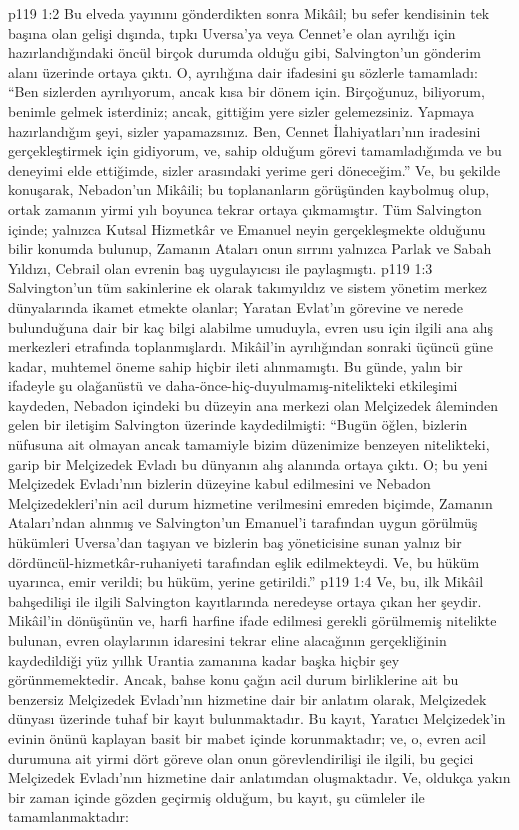 \vs p119 1:2 Bu elveda yayınını gönderdikten sonra Mikâil; bu sefer kendisinin tek başına olan gelişi dışında, tıpkı Uversa’ya veya Cennet’e olan ayrılığı için hazırlandığındaki öncül birçok durumda olduğu gibi, Salvington’un gönderim alanı üzerinde ortaya çıktı. O, ayrılığına dair ifadesini şu sözlerle tamamladı: “Ben sizlerden ayrılıyorum, ancak kısa bir dönem için. Birçoğunuz, biliyorum, benimle gelmek isterdiniz; ancak, gittiğim yere sizler gelemezsiniz. Yapmaya hazırlandığım şeyi, sizler yapamazsınız. Ben, Cennet İlahiyatları’nın iradesini gerçekleştirmek için gidiyorum, ve, sahip olduğum görevi tamamladığımda ve bu deneyimi elde ettiğimde, sizler arasındaki yerime geri döneceğim.” Ve, bu şekilde konuşarak, Nebadon’un Mikâili; bu toplananların görüşünden kaybolmuş olup, ortak zamanın yirmi yılı boyunca tekrar ortaya çıkmamıştır. Tüm Salvington içinde; yalnızca Kutsal Hizmetkâr ve Emanuel neyin gerçekleşmekte olduğunu bilir konumda bulunup, Zamanın Ataları onun sırrını yalnızca Parlak ve Sabah Yıldızı, Cebrail olan evrenin baş uygulayıcısı ile paylaşmıştı.
\vs p119 1:3 Salvington’un tüm sakinlerine ek olarak takımyıldız ve sistem yönetim merkez dünyalarında ikamet etmekte olanlar; Yaratan Evlat’ın görevine ve nerede bulunduğuna dair bir kaç bilgi alabilme umuduyla, evren usu için ilgili ana alış merkezleri etrafında toplanmışlardı. Mikâil’in ayrılığından sonraki üçüncü güne kadar, muhtemel öneme sahip hiçbir ileti alınmamıştı. Bu günde, yalın bir ifadeyle şu olağanüstü ve daha\hyp{}önce\hyp{}hiç\hyp{}duyulmamış\hyp{}nitelikteki etkileşimi kaydeden, Nebadon içindeki bu düzeyin ana merkezi olan Melçizedek âleminden gelen bir iletişim Salvington üzerinde kaydedilmişti: “Bugün öğlen, bizlerin nüfusuna ait olmayan ancak tamamiyle bizim düzenimize benzeyen nitelikteki, garip bir Melçizedek Evladı bu dünyanın alış alanında ortaya çıktı. O; bu yeni Melçizedek Evladı’nın bizlerin düzeyine kabul edilmesini ve Nebadon Melçizedekleri’nin acil durum hizmetine verilmesini emreden biçimde, Zamanın Ataları’ndan alınmış ve Salvington’un Emanuel’i tarafından uygun görülmüş hükümleri Uversa’dan taşıyan ve bizlerin baş yöneticisine sunan yalnız bir dördüncül\hyp{}hizmetkâr\hyp{}ruhaniyeti tarafından eşlik edilmekteydi. Ve, bu hüküm uyarınca, emir verildi; bu hüküm, yerine getirildi.”
\vs p119 1:4 Ve, bu, ilk Mikâil bahşedilişi ile ilgili Salvington kayıtlarında neredeyse ortaya çıkan her şeydir. Mikâil’in dönüşünün ve, harfi harfine ifade edilmesi gerekli görülmemiş nitelikte bulunan, evren olaylarının idaresini tekrar eline alacağının gerçekliğinin kaydedildiği yüz yıllık Urantia zamanına kadar başka hiçbir şey görünmemektedir. Ancak, bahse konu çağın acil durum birliklerine ait bu benzersiz Melçizedek Evladı’nın hizmetine dair bir anlatım olarak, Melçizedek dünyası üzerinde tuhaf bir kayıt bulunmaktadır. Bu kayıt, Yaratıcı Melçizedek’in evinin önünü kaplayan basit bir mabet içinde korunmaktadır; ve, o, evren acil durumuna ait yirmi dört göreve olan onun görevlendirilişi ile ilgili, bu geçici Melçizedek Evladı’nın hizmetine dair anlatımdan oluşmaktadır. Ve, oldukça yakın bir zaman içinde gözden geçirmiş olduğum, bu kayıt, şu cümleler ile tamamlanmaktadır:
